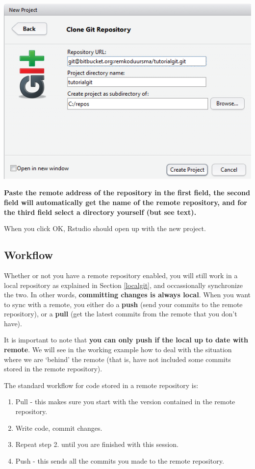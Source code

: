 \documentclass[]{book}
\providecommand{\tightlist}{%
  \setlength{\itemsep}{0pt}\setlength{\parskip}{0pt}}
\begin{document}
\includegraphics[width=0.75\linewidth]{screenshots/clonegitrepos}

\textbf{Paste the remote address of the repository in the first field, the second field will automatically get the name of the remote repository, and for the third field select a directory yourself (but see text).}

When you click OK, Rstudio should open up with the new project.

\hypertarget{gitremoteworkflow}{%
\subsection{Workflow}\label{gitremoteworkflow}}

Whether or not you have a remote repository enabled, you will still work in a local repository as explained in Section \ref{localgit}, and occassionally synchronize the two. In other words, \textbf{committing changes is always local}. When you want to sync with a remote, you either do a \textbf{push} (send your commits to the remote repository), or a \textbf{pull} (get the latest commits from the remote that you don't have).

It is important to note that \textbf{you can only push if the local up to date with remote}. We will see in the working example how to deal with the situation where we are `behind' the remote (that is, have not included some commits stored in the remote repository).

The standard workflow for code stored in a remote repository is:

\begin{enumerate}
\def\labelenumi{\arabic{enumi}.}
\tightlist
\item
  Pull - this makes sure you start with the version contained in the remote repository.
\item
  Write code, commit changes.
\item
  Repeat step 2. until you are finished with this session.
\item
  Push - this sends all the commits you made to the remote repository.
\end{enumerate}
\end{document}
